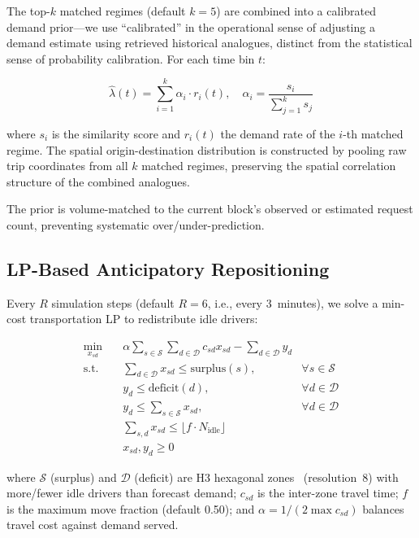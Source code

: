\documentclass[conference,10pt]{IEEEtran}
\begin{document}
The top-$k$ matched regimes (default $k=5$) are combined into a calibrated
demand prior---we use ``calibrated'' in the operational sense of adjusting
a demand estimate using retrieved historical analogues, distinct from the
statistical sense of probability calibration. For each time bin $t$:

\begin{equation}
  \hat{\lambda}(t) = \sum_{i=1}^{k} \alpha_i \cdot r_i(t), \quad
  \alpha_i = \frac{s_i}{\sum_{j=1}^{k} s_j}
  \label{eq:calibrated_rate}
\end{equation}

where $s_i$ is the similarity score and $r_i(t)$ the demand rate of the
$i$-th matched regime. The spatial origin-destination distribution is
constructed by pooling raw trip coordinates from all $k$ matched regimes,
preserving the spatial correlation structure of the combined analogues.

The prior is volume-matched to the current block's observed or estimated
request count, preventing systematic over/under-prediction.

\subsection{LP-Based Anticipatory Repositioning}
\label{sec:method:lp}

Every $R$ simulation steps (default $R=6$, i.e., every 3~minutes), we
solve a min-cost transportation LP to redistribute idle drivers:

\begin{align}
  \min_{x_{sd}} \quad & \alpha \sum_{s \in \mathcal{S}} \sum_{d \in \mathcal{D}} c_{sd} x_{sd} - \sum_{d \in \mathcal{D}} y_d \label{eq:lp_obj} \\
  \text{s.t.} \quad & \sum_{d \in \mathcal{D}} x_{sd} \leq \text{surplus}(s), & \forall s \in \mathcal{S} \label{eq:lp_supply} \\
  & y_d \leq \text{deficit}(d), & \forall d \in \mathcal{D} \label{eq:lp_demand} \\
  & y_d \leq \sum_{s \in \mathcal{S}} x_{sd}, & \forall d \in \mathcal{D} \label{eq:lp_link} \\
  & \sum_{s,d} x_{sd} \leq \lfloor f \cdot N_\text{idle} \rfloor \label{eq:lp_budget} \\
  & x_{sd}, y_d \geq 0
\end{align}

where $\mathcal{S}$ (surplus) and $\mathcal{D}$ (deficit) are H3 hexagonal
zones~\cite{brodsky2018h3} (resolution~8) with more/fewer idle drivers
than forecast demand; $c_{sd}$ is the inter-zone travel time; $f$ is the maximum move fraction (default 0.50); and
$\alpha = 1/(2 \max c_{sd})$ balances travel cost against demand served.
\end{document}
